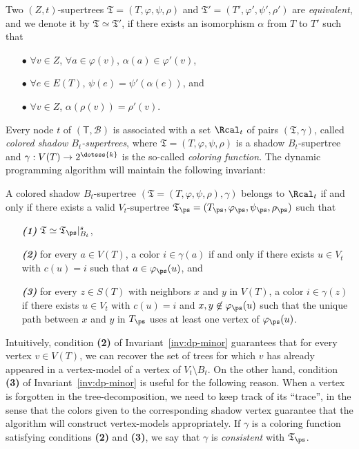 \begin{definition}\label{def:equivalent} Two $(Z,t)$-supertrees $\mathfrak{T}=(T,\varphi, \psi, \rho)$ and $\mathfrak{T}'=(T',\varphi', \psi', \rho')$ are \emph{equivalent}, and we denote it by  $\mathfrak{T}\simeq \mathfrak{T}'$, if  there exists an isomorphism $\alpha$ from $T$ to $T'$ such that
\begin{itemize}
\item[$\bullet$]  $\forall v \in Z$, $\forall a\in \varphi(v)$, $\alpha(a)\in\varphi'(v)$,
\item[$\bullet$] $\forall e \in E(T)$, $\psi(e) = \psi'(\alpha(e))$, and \item[$\bullet$] $\forall v \in Z$, $\alpha(\rho(v)) = \rho'(v)$.
\end{itemize}
\end{definition}

Every  node $t$ of $(\mathsf{T},\mathcal{B})$ is associated with a set $\Rcal_t$ of pairs  $(\mathfrak{T},\gamma)$, called \emph{colored shadow $B_t$-supertrees}, where $\mathfrak{T}=(T,\varphi,\psi,\rho)$ is a shadow $B_t$-supertree and $\gamma:V(T) \rightarrow 2^{\dotsss{k}}$ is the so-called \emph{coloring function}.
The dynamic programming algorithm will maintain the following invariant:

\begin{invariant} \label{inv:dp-minor}
{A colored shadow $B_t$-supertree $(\mathfrak{T}=(T,\varphi, \psi, \rho),\gamma)$ belongs to $\Rcal_t$ if and only if there exists a valid $V_t$-supertree $\mathfrak{T}
_\ps=(T_\ps,\varphi_\ps, \psi_\ps, \rho_\ps)$ such that}

\begin{itemize}
\item[\emph{\textbf{(1)}}] $\mathfrak{T}\simeq \mathfrak{T}_\ps|_{B_t}^s$,
\item[\emph{\textbf{(2)}}] for every $a \in V(T)$, a color $i \in \gamma(a)$ if and only if there exists $ u \in V_t$ with $c(u)=i$  such that $a \in \varphi_{\ps}(u)$, and
\item[\emph{\textbf{(3)}}] for every $z \in S(T)$ with neighbors $x$ and $y$ in $V(T)$, a color $i \in \gamma(z)$ if there exists $u \in V_t$ with $c(u)=i$ and $x,y \not \in \varphi_\ps(u)$ such that
  the unique path between $x$ and $y$ in $T_\ps$ uses at least one vertex of $\varphi_\ps(u)$.
\end{itemize}
\end{invariant}

Intuitively, condition \textbf{(2)} of Invariant~\ref{inv:dp-minor} guarantees that for every vertex $v\in V(T)$, we can recover the set of trees for which $v$ has already appeared in a vertex-model of a vertex of $V_t\setminus B_t$.  On the other hand, condition \textbf{(3)} of Invariant~\ref{inv:dp-minor} is useful for the following reason. When a vertex is forgotten in the tree-decomposition, we need to keep track of its ``trace'', in the sense that the colors given to the corresponding shadow vertex guarantee that the algorithm will  construct vertex-models appropriately.
If $\gamma$ is a coloring function satisfying conditions \textbf{(2)} and \textbf{(3)}, we say that $\gamma$ is \emph{consistent} with $\mathfrak{T}_\ps$.

